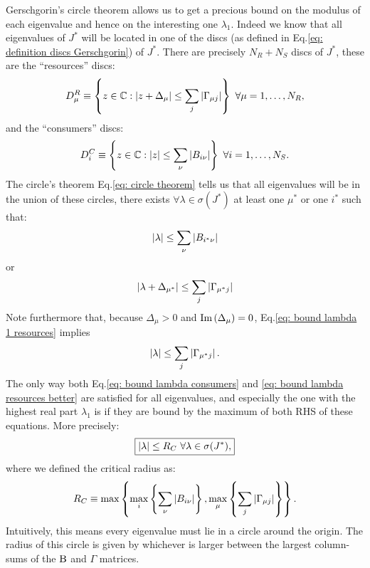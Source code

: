 \documentclass[12pt, titlepage]{report}
\begin{document}
Gerschgorin's circle theorem allows us to get a precious bound on the modulus of each eigenvalue and hence on the interesting one $\lambda_1$. Indeed we know that all eigenvalues of $J^*$ will be located in one of the discs (as defined in Eq.\eqref{eq: definition discs Gerschgorin}) of $J^*$. There are precisely $N_R + N_S$ discs of $J^*$, these are the ``resources'' discs:
\begin{equation}
D^R_\mu  \equiv \left\{ z \in \mathbb{C}: \left|{z+\Delta_\mu}\right| \leq \sum_j \left|{\Gamma_{\mu j}}\right| \right\}  \ \forall \mu = 1, \dots, N_R,
\end{equation}
and the ``consumers'' discs:
\begin{equation}
D^C_i \equiv \left\{ z \in \mathbb{C}: \left|{z}\right| \leq \sum_\nu \left|{B_{i\nu}}\right|\right\} \ \forall i=1, \dots, N_S.
\end{equation}
The circle's theorem Eq.\eqref{eq: circle theorem} tells us that all eigenvalues will be in the union of these circles, \ie there exists $\forall \lambda \in \sigma\left(J^*\right)$ at least one $\mu^*$ or  one $i^*$ such that:
\begin{equation}
\left|{\lambda}\right| \leq \sum_\nu \left|{B_{i^*\nu}}\right| \label{eq: bound lambda consumers}
\end{equation}
or
\begin{equation}
\left|{\lambda+\Delta_{\mu^*}}\right| \leq \sum_j \left|{\Gamma_{\mu^* j}}\right| \label{eq: bound lambda 1 resources}
\end{equation}
Note furthermore that, because $\Delta_\mu > 0$ and $\text{Im}\left(\Delta_\mu\right)=0$, Eq.\eqref{eq: bound lambda 1 resources} implies
\begin{equation}
\left|{\lambda}\right| \leq \sum_j \left|{\Gamma_{\mu^* j}}\right|. \label{eq: bound lambda resources better}
\end{equation}
The only way both Eq.\eqref{eq: bound lambda consumers} and \eqref{eq: bound lambda resources better} are satisfied for all eigenvalues, and especially the one with the highest real part $\lambda_1$ is if they are bound by the maximum of both RHS of these equations. More precisely:
\begin{equation}
\boxed{
\left|{\lambda}\right| \leq R_C \ \forall \lambda \in \sigma(J^*), \label{eq: overall bound on lambda}
}
\end{equation}
where we defined the critical radius as:
\begin{equation}
R_C \equiv \max\left\{\max_i\left\{\sum_\nu \left|{B_{i\nu}}\right|\right\}, \max_\mu\left\{\sum_j \left|{\Gamma_{\mu j}}\right|\right\}\right\}.
\end{equation}
Intuitively, this means every eigenvalue must lie in a circle around the origin. The radius of this circle is given by whichever is larger between the largest column-sums of the $\text{B}$ and $\Gamma$ matrices.
\end{document}
